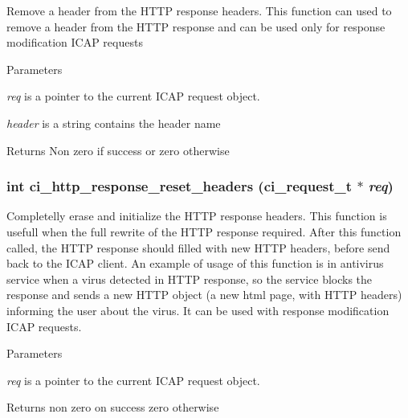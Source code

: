 Remove a header from the HTTP response headers. This function can used to remove a header from the HTTP response and can be used only for response modification ICAP requests 
\begin{DoxyParams}{Parameters}
\item[{\em req}]is a pointer to the current ICAP request object. \item[{\em header}]is a string contains the header name \end{DoxyParams}
\begin{DoxyReturn}{Returns}
Non zero if success or zero otherwise 
\end{DoxyReturn}
\hypertarget{group__HTTP_ga2b27cdeba155520463363bf341182dc7}{
\subsubsection[{ci\_\-http\_\-response\_\-reset\_\-headers}]{\setlength{\rightskip}{0pt plus 5cm}int ci\_\-http\_\-response\_\-reset\_\-headers ({\bf ci\_\-request\_\-t} $\ast$ {\em req})}}
\label{group__HTTP_ga2b27cdeba155520463363bf341182dc7}


Completelly erase and initialize the HTTP response headers. This function is usefull when the full rewrite of the HTTP response required. After this function called, the HTTP response should filled with new HTTP headers, before send back to the ICAP client. An example of usage of this function is in antivirus service when a virus detected in HTTP response, so the service blocks the response and sends a new HTTP object (a new html page, with HTTP headers) informing the user about the virus. It can be used with response modification ICAP requests. 
\begin{DoxyParams}{Parameters}
\item[{\em req}]is a pointer to the current ICAP request object. \end{DoxyParams}
\begin{DoxyReturn}{Returns}
non zero on success zero otherwise 
\end{DoxyReturn}
